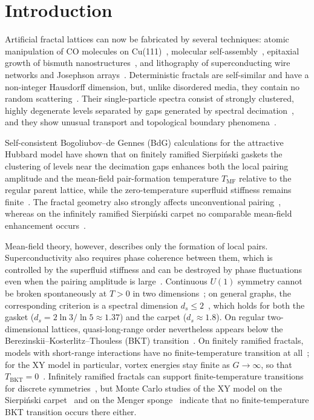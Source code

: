 \documentclass[aps,prb,twocolumn,superscriptaddress,floatfix]{revtex4-2}
\newcommand{\Tmf}{T_{\mathrm{MF}}}
\begin{document}
\section{Introduction}
\label{sec:intro}

Artificial fractal lattices can now be fabricated by several techniques:
atomic manipulation of CO molecules on Cu(111)~\cite{Kempkes2019}, molecular
self-assembly~\cite{Shang2015,Li2017}, epitaxial growth of bismuth
nanostructures~\cite{Canyellas2024Bi}, and lithography of superconducting wire
networks and Josephson arrays~\cite{Gordon1986,Meyer1991,Meyer2002,Amundsen2024}.
Deterministic fractals are self-similar and have a non-integer Hausdorff
dimension, but, unlike disordered media, they contain no random
scattering~\cite{Mandelbrot1982,Akkermans2012}. Their single-particle spectra
consist of strongly clustered, highly degenerate levels separated by gaps
generated by spectral decimation~\cite{Domany1983,Rammal1984,Iliasov2019,Iliasov2020},
and they show unusual transport and topological boundary
phenomena~\cite{Westerhout2018,Brzezinska2018,Fremling2020,Biesenthal2022}.

Self-consistent Bogoliubov--de Gennes (BdG) calculations for the attractive
Hubbard model have shown that on finitely ramified Sierpi\'nski gaskets the
clustering of levels near the decimation gaps enhances both the local pairing
amplitude and the mean-field pair-formation temperature $\Tmf$ relative to the
regular parent lattice, while the zero-temperature superfluid stiffness
remains finite~\cite{Iliasov2024}. The fractal geometry also strongly affects
unconventional pairing~\cite{Canyellas2026dwave}, whereas on the infinitely
ramified Sierpi\'nski carpet no comparable mean-field enhancement
occurs~\cite{Iliasov2024}.

Mean-field theory, however, describes only the formation of local pairs.
Superconductivity also requires phase coherence between them, which is
controlled by the superfluid stiffness and can be destroyed by phase
fluctuations even when the pairing amplitude is large~\cite{Emery1995}.
Continuous $U(1)$ symmetry cannot be broken spontaneously at $T>0$ in two
dimensions~\cite{MWH_Mermin1966,Hohenberg1967}; on general graphs, the
corresponding criterion is a spectral dimension $d_s \le 2$~\cite{Cassi1992},
which holds for both the gasket ($d_s = 2\ln 3/\ln 5 \approx 1.37$) and the
carpet ($d_s \approx 1.8$). On regular two-dimensional lattices,
quasi-long-range order nevertheless appears below the
Berezinskii--Kosterlitz--Thouless (BKT) transition~\cite{Ber71,KT73,NK77}. On
finitely ramified fractals, models with short-range interactions have no
finite-temperature transition at all~\cite{GMA80,GAM83}; for the XY model in
particular, vortex energies stay finite as $G\to\infty$, so that
$T_{\mathrm{BKT}} = 0$~\cite{Vallat1991,MB10}. Infinitely ramified fractals
can support finite-temperature transitions for discrete
symmetries~\cite{Gefen1984carpet}, but Monte Carlo studies of the XY model on
the Sierpi\'nski carpet~\cite{Carpet13} and on the Menger
sponge~\cite{Przedborski2014} indicate that no finite-temperature BKT
transition occurs there either.
\end{document}

